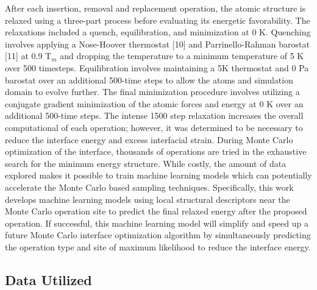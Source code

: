 \documentclass[aip,reprint,longbibliography,amsmath,amssymb,twocolumn,superscriptaddress]{revtex4-1}
\begin{document}
After each insertion, removal and replacement operation, the atomic structure is relaxed using a three-part process before evaluating its energetic favorability. 
%
The relaxations included a quench, equilibration, and minimization at 0 K. Quenching involves applying a Nose-Hoover thermostat [10] and Parrinello-Rahman barostat [11] at 0.9 T$_{m}$ and dropping the temperature to a minimum temperature of 5 K over 500 timesteps. 
%
Equilibration involves maintaining a 5K thermostat and 0 Pa barostat over an additional 500-time steps to allow the atoms and simulation domain to evolve further. 
%
The final minimization procedure involves utilizing a conjugate gradient minimization of the atomic forces and energy at 0 K over an additional 500-time steps.  
%
The intense 1500 step relaxation increases the overall computational of each operation; however, it was determined to be necessary to reduce the interface energy and excess interfacial strain.
%
During Monte Carlo optimization of the interface, thousands of operations are tried in the exhaustive search for the minimum energy structure.  
%
While costly, the amount of data explored makes it possible to train machine learning models which can potentially accelerate the Monte Carlo based sampling techniques.  
%
Specifically, this work develops machine learning models using local structural descriptors near the Monte Carlo operation site to predict the final relaxed energy after the proposed operation. 
%
If successful, this machine learning model will simplify and speed up a future Monte Carlo interface optimization algorithm by simultaneously predicting the operation type and site of maximum likelihood to reduce the interface energy.

\subsection{Data Utilized}
\end{document}
